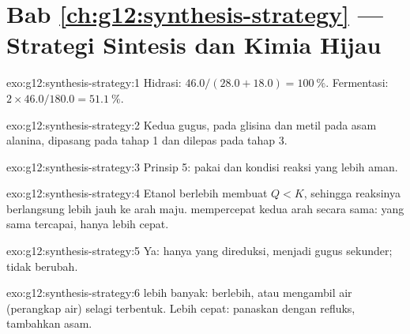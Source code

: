 \section*{Bab \ref{ch:g12:synthesis-strategy} --- Strategi Sintesis dan Kimia Hijau}

\begin{solution}{exo:g12:synthesis-strategy:1}
Hidrasi: $46.0/(28.0 + 18.0) = \qty{100}{\percent}$. Fermentasi:
$2 \times 46.0/180.0 = \qty{51.1}{\percent}$.
\end{solution}

\begin{solution}{exo:g12:synthesis-strategy:2}
Kedua gugus,  pada  glisina dan  metil pada asam
alanina, dipasang pada tahap 1 dan dilepas pada tahap 3.
\end{solution}

\begin{solution}{exo:g12:synthesis-strategy:3}
Prinsip 5: pakai  dan kondisi reaksi yang lebih aman.
\end{solution}

\begin{solution}{exo:g12:synthesis-strategy:4}
Etanol berlebih membuat $Q < K$, sehingga reaksinya berlangsung lebih
jauh ke arah maju.  mempercepat kedua arah secara sama:  yang sama tercapai, hanya lebih cepat.
\end{solution}

\begin{solution}{exo:g12:synthesis-strategy:5}
Ya: hanya  yang direduksi, menjadi gugus  sekunder;
 tidak berubah.
\end{solution}

\begin{solution}{exo:g12:synthesis-strategy:6}
 lebih banyak:  berlebih, atau mengambil air (perangkap
air) selagi terbentuk. Lebih cepat: panaskan dengan refluks, tambahkan
 asam.
\end{solution}

